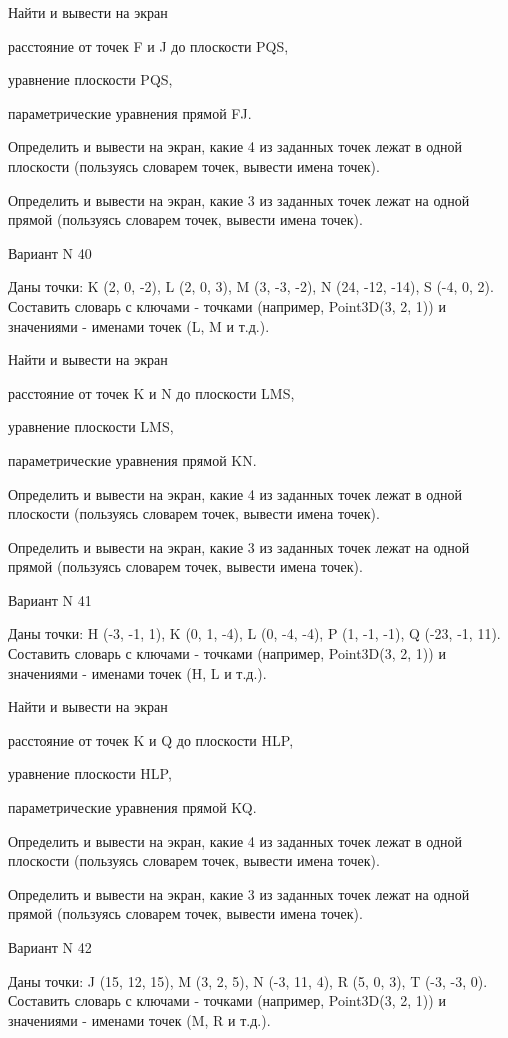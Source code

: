 \documentclass[11pt]{report}
\begin{document}
 
Найти и вывести на экран


расстояние от точек F и J до плоскости PQS,

 
уравнение плоскости PQS,

 
параметрические уравнения прямой FJ.


Определить и вывести на экран, какие 4 из заданных точек лежат в одной плоскости (пользуясь словарем точек, вывести имена точек).


Определить и вывести на экран, какие 3 из заданных точек лежат на одной прямой (пользуясь словарем точек, вывести имена точек).

Вариант N 40

Даны точки: K (2, 0, -2), L (2, 0, 3), M (3, -3, -2), N (24, -12, -14), S (-4, 0, 2).
Составить словарь с ключами - точками (например, Point3D(3, 2, 1)) и значениями - именами точек (L, M и т.д.).

 
Найти и вывести на экран


расстояние от точек K и N до плоскости LMS,

 
уравнение плоскости LMS,

 
параметрические уравнения прямой KN.


Определить и вывести на экран, какие 4 из заданных точек лежат в одной плоскости (пользуясь словарем точек, вывести имена точек).


Определить и вывести на экран, какие 3 из заданных точек лежат на одной прямой (пользуясь словарем точек, вывести имена точек).

Вариант N 41

Даны точки: H (-3, -1, 1), K (0, 1, -4), L (0, -4, -4), P (1, -1, -1), Q (-23, -1, 11).
Составить словарь с ключами - точками (например, Point3D(3, 2, 1)) и значениями - именами точек (H, L и т.д.).

 
Найти и вывести на экран


расстояние от точек K и Q до плоскости HLP,

 
уравнение плоскости HLP,

 
параметрические уравнения прямой KQ.


Определить и вывести на экран, какие 4 из заданных точек лежат в одной плоскости (пользуясь словарем точек, вывести имена точек).


Определить и вывести на экран, какие 3 из заданных точек лежат на одной прямой (пользуясь словарем точек, вывести имена точек).

Вариант N 42

Даны точки: J (15, 12, 15), M (3, 2, 5), N (-3, 11, 4), R (5, 0, 3), T (-3, -3, 0).
Составить словарь с ключами - точками (например, Point3D(3, 2, 1)) и значениями - именами точек (M, R и т.д.).
\end{document}
